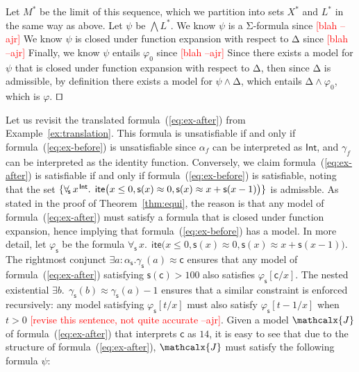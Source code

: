 \documentclass[runningheads,a4paper]{llncs}
\newcommand\DDD{\Delta}
\newcommand{\con}[1]{\mathsf{#1}}
\let\oldSigma=\Sigma
\def\Sigma{\mathrm{\oldSigma}}
\let\oldDelta=\Delta
\def\Delta{\mathrm{\oldDelta}}
\let\oldwedge=\wedge
\def\wedge{\mathrel{\oldwedge}}
\newcommand{\teq}{\approx}
\newcommand{\I}{\mathcalx{J}} %
\newcommand{\sortint}{\ty{Int}}
\newcommand\ty[1]{\con{#1}}
\newcommand{\lite}{\con{ite}}
\newcommand\concret{\gamma} %
\newcommand{\forallf}[1]{\forall_{\!#1\:}}
\newcommand{\farg}[1]{\concret_{#1}}
\newcommand{\fargsort}[1]{\alpha_{#1}}
\newcommand{\rem}[1]{\textcolor{red}{[#1]}}
\newcommand{\ajr}[1]{\rem{#1 --ajr}}
\newcommand{\vthinspace}{\kern+0.083333em}
\newcommand{\typ}[1]{^{\vthinspace #1}}
\renewcommand\qed{{\hfill$\squareforqed$}}
\begin{document}
\begin{proofsketch}
Let $M^\ast$ be the limit of this sequence, which we partition into sets $X^\ast$ and $L^\ast$ in the same way as above.
Let $\psi$ be $\bigwedge L^\ast$.
We know $\psi$ is a $\Sigma$-formula since \ajr{blah}
We know $\psi$ is closed under function expansion with respect to $\DDD$ since \ajr{blah}
Finally, we know $\psi$ entails $\varphi_0$ since \ajr{blah}
Since there exists a model for $\psi$ that is closed under function expansion
with respect to $\DDD$, then since $\DDD$ is admissible, by definition there
exists a model for $\psi \wedge \DDD$, which entails $\DDD \wedge \varphi_0$,
which is $\varphi$.
\qed
\end{proofsketch}

\begin{example}
Let us revisit the translated formula~(\ref{eq:ex-after}) from
Example~\ref{ex:translation}. This formula is unsatisfiable if and only if
formula~(\ref{eq:ex-before}) is unsatisfiable since $\fargsort{f}$ can be
interpreted as $\sortint$, and $\farg{f}$ can be interpreted as the identity
function. Conversely, we claim formula~(\ref{eq:ex-after}) is satisfiable if
and only if formula~(\ref{eq:ex-before}) is satisfiable, noting that the set
$\{ \forallf{\con{s}} x\typ{\sortint}.\;\, \lite\bigl( x \leq 0, \con{s}(x)
\teq 0, \con{s}( x ) \teq x + \con{s}( x-1 ) \bigr) \}$ is admissble.
As stated
in the proof of Theorem~\ref{thm:equi}, the reason is that any model of
formula~(\ref{eq:ex-after}) must satisfy a formula that is closed under
function expansion, hence implying that formula~(\ref{eq:ex-before}) has a
model. In more detail, let $\varphi_\con{s}$ be the formula $\forallf{\con{s}} x.\;\,
\lite\bigl( x \leq 0, \con{s}(x) \teq 0, \con{s}( x ) \teq x + \con{s}( x-1 )
\bigr)$. The rightmost conjunct $\exists a : {\fargsort{\con{s}}}.
\farg{\con{s}}( a ) \teq \con{c}$ ensures that any model of
formula~(\ref{eq:ex-after}) satisfying $\con{s}( \con{c} ) > 100$ also
satisfies $\varphi_{\con{s}}[\con{c}/x]$. The nested existential
$\exists b.\;\, \farg{\con{s}}( b ) \teq \farg{\con{s}}( a )-1$ ensures that
a similar constraint is enforced recursively: any model satisfying $\varphi_{\con{s}}[t/x]$
must also satisfy $\varphi_{\con{s}}[t-1/x]$ when $t > 0$ \ajr{revise this sentence, not quite accurate}. Given a model $\I$ of
formula~(\ref{eq:ex-after}) that interprets $\con{c}$ as $14$, it is easy to see that
due to the structure of formula~(\ref{eq:ex-after}),
$\I$ must satisfy the following formula $\psi$:
%
\begin{equation} \label{eq:fun-closure}
\begin{split}

\end{split}
\end{equation}
\end{example}
\end{document}

